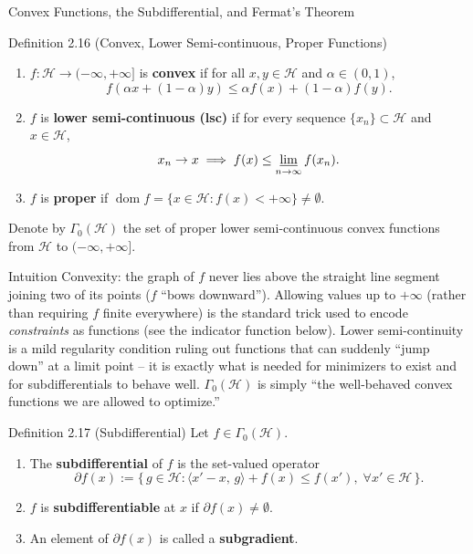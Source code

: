 \documentclass[aspectratio=169,10pt]{beamer}
\DeclareMathOperator{\dom}{dom}
\begin{document}
\begin{frame}[allowframebreaks]{Convex Functions, the Subdifferential, and Fermat's Theorem}

  \begin{block}{Definition 2.16 (Convex, Lower Semi-continuous, Proper Functions)}
    \begin{enumerate}
      \item[(1)] $f : \mathcal{H} \to (-\infty,+\infty]$ is \textbf{convex} if
        for all $x,y \in \mathcal{H}$ and $\alpha \in (0,1)$,
        \[
          f(\alpha x + (1-\alpha)y) \le \alpha f(x) + (1-\alpha)f(y).
        \]
      \item[(2)] $f$ is \textbf{lower semi-continuous (lsc)} if for every
        sequence $\{x_n\} \subset \mathcal{H}$ and $x \in \mathcal{H}$,
        \[
          x_n \to x \implies f(x) \le \varliminf_{n\to\infty} f(x_n).
        \]
      \item[(3)] $f$ is \textbf{proper} if
        $\dom f = \{x \in \mathcal{H} : f(x) < +\infty\} \ne \emptyset$.
    \end{enumerate}
    Denote by $\Gamma_0(\mathcal{H})$ the set of proper lower semi-continuous
    convex functions from $\mathcal{H}$ to $(-\infty, +\infty]$.
  \end{block}

  \begin{block}{Intuition}
    Convexity: the graph of $f$ never lies above the straight line segment
    joining two of its points ($f$ ``bows downward''). Allowing values up to
    $+\infty$ (rather than requiring $f$ finite everywhere) is the standard
    trick used to encode \emph{constraints} as functions (see the indicator
    function below). Lower semi-continuity is a mild regularity condition
    ruling out functions that can suddenly ``jump down'' at a limit point --
    it is exactly what is needed for minimizers to exist and for
    subdifferentials to behave well. $\Gamma_0(\mathcal{H})$ is simply ``the
    well-behaved convex functions we are allowed to optimize.''
  \end{block}

  \framebreak

  \begin{block}{Definition 2.17 (Subdifferential)}
    Let $f \in \Gamma_0(\mathcal{H})$.
    \begin{enumerate}
      \item[(1)] The \textbf{subdifferential} of $f$ is the set-valued
        operator
        \[
          \partial f(x) := \big\{\, g \in \mathcal{H} :
          \langle x'-x,\, g\rangle + f(x) \le f(x'),\; \forall x' \in \mathcal{H} \,\big\}.
        \]
      \item[(2)] $f$ is \textbf{subdifferentiable} at $x$ if
        $\partial f(x) \ne \emptyset$.
      \item[(3)] An element of $\partial f(x)$ is called a
        \textbf{subgradient}.
    \end{enumerate}
  \end{block}


\end{frame}
\end{document}
